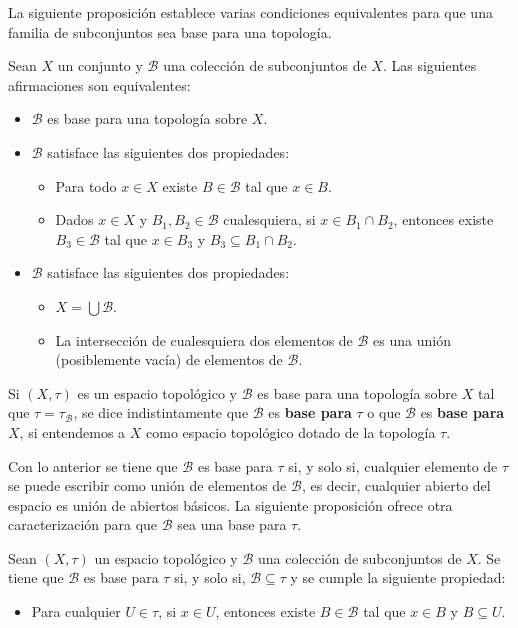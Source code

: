 La siguiente proposición establece varias condiciones equivalentes para que una familia de subconjuntos sea base para una topología.
\begin{Prop}\label{Prop:Caracterizacion_base}
   Sean $X$ un conjunto y $\mathcal{B}$ una colección de subconjuntos de $X$. Las siguientes afirmaciones son equivalentes:
   \begin{itemize}
      \item[1.] $\mathcal{B}$ es base para una topología sobre $X$.
      \item[2.] $\mathcal{B}$ satisface las siguientes dos propiedades:
         \begin{itemize}
            \item Para todo $x\in X$ existe $B\in \mathcal{B}$ tal que $x\in B$.
            \item Dados $x\in X$ y $B_1,B_2\in \mathcal{B}$ cualesquiera, si $x\in B_1\cap B_2$, entonces existe $B_3\in \mathcal{B}$ tal que $x\in B_3$ y $B_3\subseteq B_1\cap B_2$.
         \end{itemize}
      \item[3.] $\mathcal{B}$ satisface las siguientes dos propiedades:
         \begin{itemize}
            \item $X = \bigcup \mathcal{B}$.
            \item La intersección de cualesquiera dos elementos de $\mathcal{B}$ es una unión (posiblemente vacía) de elementos de $\mathcal{B}$.
         \end{itemize}
   \end{itemize}
\end{Prop}
\begin{Obs}
   Si $(X,\tau)$ es un espacio topológico y $\mathcal{B}$ es base para una topología sobre $X$ tal que $\tau = \tau_\mathcal{B}$, se dice indistintamente que $\mathcal{B}$ es \textbf{base para} $\tau$ o que $\mathcal{B}$ es \textbf{base para} $X$, si entendemos a $X$ como espacio topológico dotado de la topología $\tau$.
\end{Obs}
Con lo anterior se tiene que $\mathcal{B}$ es base para $\tau$ si, y solo si, cualquier elemento de $\tau$ se puede escribir como unión de elementos de $\mathcal{B}$, es decir, cualquier abierto del espacio es unión de abiertos básicos. La siguiente proposición ofrece otra caracterización para que $\mathcal{B}$ sea una base para $\tau$.
\begin{Prop}\label{Prop:base_para_tau}
   Sean $(X,\tau)$ un espacio topológico y $\mathcal{B}$ una colección de subconjuntos de $X$. Se tiene que $\mathcal{B}$ es base para $\tau$ si, y solo si, $\mathcal{B}\subseteq\tau$ y se cumple la siguiente propiedad:
   \begin{itemize}
      \item Para cualquier $U\in \tau$, si $x\in U$, entonces existe $B\in \mathcal{B}$ tal que $x\in B$ y $B\subseteq U$.
   \end{itemize}
\end{Prop}
